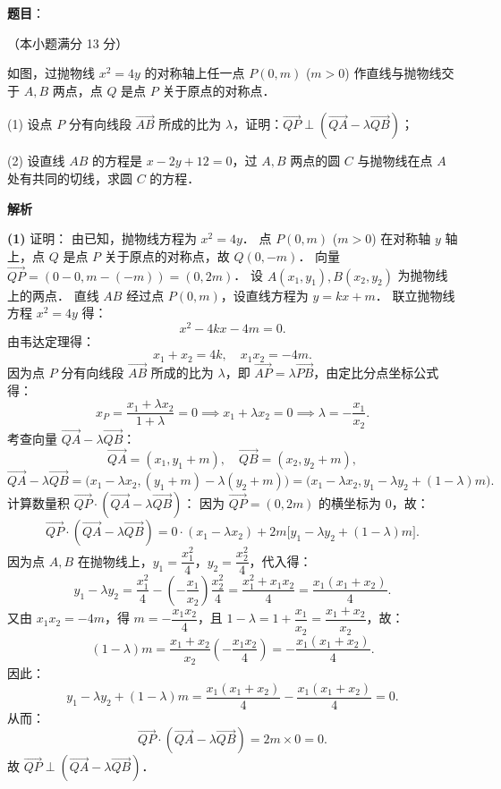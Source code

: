 \begin{answer}

\textbf{题目}：

（本小题满分 13 分）

如图，过抛物线 $x^2 = 4y$ 的对称轴上任一点 $P(0, m)$ ($m > 0$) 作直线与抛物线交于 $A, B$ 两点，点 $Q$ 是点 $P$ 关于原点的对称点．
\nopagebreak[4]
\begin{center}\end{center}
\nopagebreak[4]
(1) 设点 $P$ 分有向线段 $\vec{AB}$ 所成的比为 $\lambda$，证明：$\vec{QP} \perp (\vec{QA} - \lambda\vec{QB})$；

(2) 设直线 $AB$ 的方程是 $x - 2y + 12 = 0$，过 $A, B$ 两点的圆 $C$ 与抛物线在点 $A$ 处有共同的切线，求圆 $C$ 的方程．

\textbf{解析}
\nopagebreak[4]
\begin{center}\end{center}
\nopagebreak[4]
\textbf{(1)} 证明：
由已知，抛物线方程为 $x^2 = 4y$．
点 $P(0, m)$ ($m > 0$) 在对称轴 $y$ 轴上，点 $Q$ 是点 $P$ 关于原点的对称点，故 $Q(0, -m)$．
向量 $\vec{QP} = (0 - 0, m - (-m)) = (0, 2m)$．
设 $A(x_1, y_1), B(x_2, y_2)$ 为抛物线上的两点．
直线 $AB$ 经过点 $P(0, m)$，设直线方程为 $y = kx + m$．
联立抛物线方程 $x^2 = 4y$ 得：
\nopagebreak[4]
\[
x^2 - 4kx - 4m = 0.
\]
由韦达定理得：
\nopagebreak[4]
\[
x_1 + x_2 = 4k, \quad x_1 x_2 = -4m.
\]
因为点 $P$ 分有向线段 $\vec{AB}$ 所成的比为 $\lambda$，即 $\vec{AP} = \lambda\vec{PB}$，由定比分点坐标公式得：
\nopagebreak[4]
\[
x_P = \frac{x_1 + \lambda x_2}{1 + \lambda} = 0 \implies x_1 + \lambda x_2 = 0 \implies \lambda = -\frac{x_1}{x_2}.
\]
考查向量 $\vec{QA} - \lambda\vec{QB}$：
\nopagebreak[4]
\[
\vec{QA} = (x_1, y_1 + m), \quad \vec{QB} = (x_2, y_2 + m),
\]
\nopagebreak[4]
\[
\vec{QA} - \lambda\vec{QB} = \big(x_1 - \lambda x_2, (y_1 + m) - \lambda(y_2 + m)\big) = \big(x_1 - \lambda x_2, y_1 - \lambda y_2 + (1 - \lambda)m\big).
\]
计算数量积 $\vec{QP} \cdot (\vec{QA} - \lambda\vec{QB})$：
因为 $\vec{QP} = (0, 2m)$ 的横坐标为 $0$，故：
\nopagebreak[4]
\[
\vec{QP} \cdot (\vec{QA} - \lambda\vec{QB}) = 0 \cdot (x_1 - \lambda x_2) + 2m \big[y_1 - \lambda y_2 + (1 - \lambda)m\big].
\]
因为点 $A, B$ 在抛物线上，$y_1 = \dfrac{x_1^2}{4}$，$y_2 = \dfrac{x_2^2}{4}$，代入得：
\nopagebreak[4]
\[
y_1 - \lambda y_2 = \frac{x_1^2}{4} - \left(-\frac{x_1}{x_2}\right)\frac{x_2^2}{4} = \frac{x_1^2 + x_1 x_2}{4} = \frac{x_1(x_1 + x_2)}{4}.
\]
又由 $x_1 x_2 = -4m$，得 $m = -\dfrac{x_1 x_2}{4}$，且 $1 - \lambda = 1 + \dfrac{x_1}{x_2} = \dfrac{x_1 + x_2}{x_2}$，故：
\nopagebreak[4]
\[
(1 - \lambda)m = \frac{x_1 + x_2}{x_2} \left(-\frac{x_1 x_2}{4}\right) = -\frac{x_1(x_1 + x_2)}{4}.
\]
因此：
\nopagebreak[4]
\[
y_1 - \lambda y_2 + (1 - \lambda)m = \frac{x_1(x_1 + x_2)}{4} - \frac{x_1(x_1 + x_2)}{4} = 0.
\]
从而：
\nopagebreak[4]
\[
\vec{QP} \cdot (\vec{QA} - \lambda\vec{QB}) = 2m \times 0 = 0.
\]
故 $\vec{QP} \perp (\vec{QA} - \lambda\vec{QB})$．


\end{answer}
